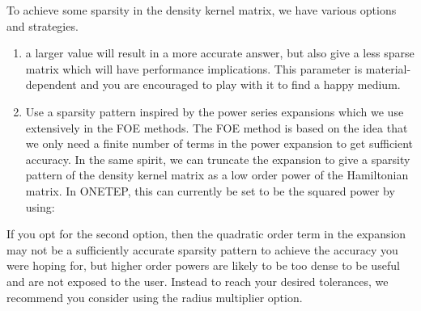 \documentclass[letterpaper,10pt,english]{sphinxmanual}
\begin{document}
To achieve some sparsity in the density kernel matrix, we have various
options and strategies.
\begin{enumerate}
\item {} 

%
\begin{sphinxVerbatim}[commandchars=\\\{\}]
   
\end{sphinxVerbatim}

a larger value will result in a more accurate answer, but also give a
less sparse matrix which will have performance implications. This
parameter is material-dependent and you are encouraged to play with
it to find a happy medium.

\item {} 
Use a sparsity pattern inspired by the power series expansions which
we use extensively in the FOE methods. The FOE method is based on the
idea that we only need a finite number of terms in the power
expansion to get sufficient accuracy. In the same spirit, we can
truncate the expansion to give a sparsity pattern of the density
kernel matrix as a low order power of the Hamiltonian matrix. In
ONETEP, this can currently be set to be the squared power by using:

%
\begin{sphinxVerbatim}[commandchars=\\\{\}]
  
\end{sphinxVerbatim}

\end{enumerate}

If you opt for the second option, then the quadratic order term in the
expansion may not be a sufficiently accurate sparsity pattern to achieve
the accuracy you were hoping for, but higher order powers are likely to
be too dense to be useful and are not exposed to the user. Instead to
reach your desired tolerances, we recommend you consider using the
radius multiplier option.
\end{document}
